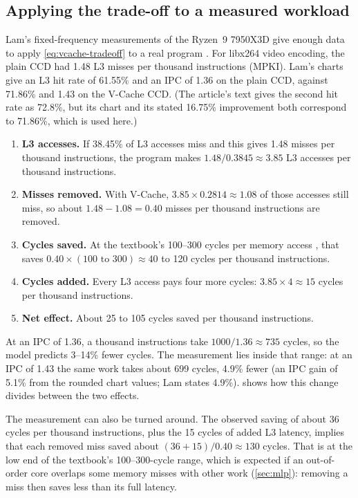 \subsection{Applying the trade-off to a measured workload}
\label{sec:tradeoff-example}
Lam's fixed-frequency measurements of the Ryzen~9 7950X3D give enough data to apply \cref{eq:vcache-tradeoff} to a real program \cite{lamAMDs7950X3DZen2023}. For libx264 video encoding, the plain CCD had 1.48 L3 misses per thousand instructions (MPKI). Lam's charts give an L3 hit rate of 61.55\% and an IPC of 1.36 on the plain CCD, against 71.86\% and 1.43 on the V-Cache CCD. (The article's text gives the second hit rate as 72.8\%, but its chart and its stated 16.75\% improvement both correspond to 71.86\%, which is used here.)
\begin{enumerate}
  \item \textbf{L3 accesses.} If 38.45\% of L3 accesses miss and this gives 1.48 misses per thousand instructions, the program makes $1.48 / 0.3845 \approx 3.85$ L3 accesses per thousand instructions.
  \item \textbf{Misses removed.} With V-Cache, $3.85 \times 0.2814 \approx 1.08$ of those accesses still miss, so about $1.48 - 1.08 = 0.40$ misses per thousand instructions are removed.
  \item \textbf{Cycles saved.} At the textbook's 100--300 cycles per memory access \cite[sec.~12.4.8]{sarangi2025basic}, that saves $0.40 \times (100\text{ to }300) \approx 40$ to 120 cycles per thousand instructions.
  \item \textbf{Cycles added.} Every L3 access pays four more cycles: $3.85 \times 4 \approx 15$ cycles per thousand instructions.
  \item \textbf{Net effect.} About 25 to 105 cycles saved per thousand instructions.
\end{enumerate}
At an IPC of 1.36, a thousand instructions take $1000/1.36 \approx 735$ cycles, so the model predicts 3--14\% fewer cycles. The measurement lies inside that range: at an IPC of 1.43 the same work takes about 699 cycles, 4.9\% fewer (an IPC gain of 5.1\% from the rounded chart values; Lam states 4.9\%).  shows how this change divides between the two effects.




The measurement can also be turned around. The observed saving of about 36 cycles per thousand instructions, plus the 15 cycles of added L3 latency, implies that each removed miss saved about $(36 + 15)/0.40 \approx 130$ cycles. That is at the low end of the textbook's 100--300-cycle range, which is expected if an out-of-order core overlaps some memory misses with other work (\cref{sec:mlp}): removing a miss then saves less than its full latency.

